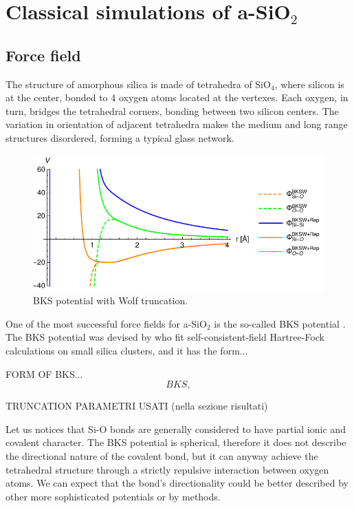 \section{Classical simulations of a-SiO$_2$}  \label{sec:silica-classical}

\subsection{Force field}  \label{sec:glass-force-field}

The structure of amorphous silica is made of tetrahedra of SiO$_4$, where silicon is at the center, bonded to 4 oxygen atoms located at the vertexes. Each oxygen, in turn, bridges the tetrahedral corners, bonding between two silicon centers. The variation in orientation of adjacent tetrahedra makes the medium and long range structures disordered, forming a typical glass network.

\begin{figure}[!tb]
    \centering
    \includegraphics[]{chapters/chapter6/figures/BKSW.pdf}
    \caption{BKS potential with Wolf truncation.}
    \label{fig:BKS-potential}
\end{figure}

One of the most successful force fields for a-SiO$_2$ is the so-called BKS potential \cite{Silica-BKS-1990}. 
The BKS potential was devised by \citeauthor*{Silica-BKS-1990} who fit self-consistent-field Hartree-Fock calculations on small silica clusters, and it has the form...

FORM OF BKS...
\begin{equation}
    BKS, \label{eq:BKS}
\end{equation}

TRUNCATION
PARAMETRI USATI (nella sezione risultati)

Let us notices that Si-O bonds are generally considered to have partial ionic and covalent character. The BKS potential is spherical, therefore it does not describe the directional nature of the covalent bond, but it can anyway achieve the tetrahedral structure through a strictly repulsive interaction between oxygen atoms. We can expect that the bond's directionality could be better described by other more sophisticated potentials or by \abinitio methods.

